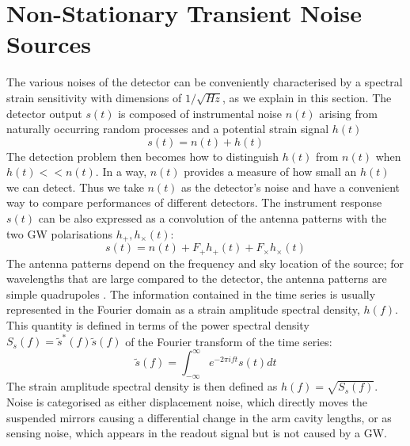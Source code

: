\documentclass[binding=0.6cm, LaM]{sapthesis}
\begin{document}
\section{Non-Stationary Transient Noise Sources}
	The various noises of the detector can be conveniently characterised by a spectral strain
        sensitivity with dimensions of $1/\sqrt{Hz}$, as we explain in this section. 
        The detector output $s(t)$ is composed of instrumental noise $n(t)$ arising from
        naturally occurring random processes and a potential strain signal $h(t)$
        \begin{equation}
          s(t) = n(t) + h(t)
        \end{equation}
        The detection problem then becomes how to distinguish $h(t)$ from $n(t)$ when $h(t) << n(t)$.
        In a way, $n(t)$ provides a measure of how small an $h(t)$ we can detect.
        Thus we take $n(t)$ as the detector’s noise and have a convenient way to
        compare performances of different detectors.
	The instrument response $s(t)$ can be also expressed as a convolution of the antenna patterns 
	with the two GW polarisations $h_{+}, h_{\times}(t)$:
        \begin{equation}
          s(t) = n(t) +  F_{+}h_{+} (t) + F_{\times}h_{\times}(t)
        \end{equation} 
	The antenna patterns depend on the frequency and sky location of the source; 
	for wavelengths that are large compared to the detector, the antenna patterns are simple quadrupoles \cite{19}.
	The information contained in the time series is usually represented in the Fourier domain 
	as a strain amplitude spectral density, $h(f)$.
	This quantity is defined in terms of the power spectral density $S_s(f) = \tilde s^{*}(f) \tilde s(f)$
	of the Fourier transform of the time series:
        \begin{equation}
          \tilde s(f) = \int^{\infty}_{-\infty} e^{-2 \pi ift} s(t)dt
        \end{equation}
	The strain amplitude spectral density is then defined as $h(f) = \sqrt{S_s(f)}$.
	Noise is categorised as either displacement noise, which directly moves the suspended mirrors
        causing a differential change in the arm cavity lengths, or as sensing noise,
        which appears in the readout signal but is not caused by a GW.
\end{document}
